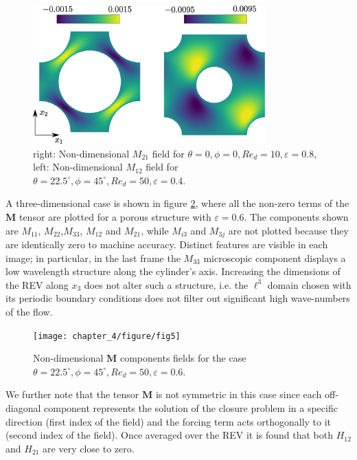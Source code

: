 \begin{figure}[H]
	\centering
	\includegraphics[width=0.8\textwidth]{chapter_4/figure/fig3}
	\caption{right: Non-dimensional $M_{21}$ field for $\theta=0, \phi=0, Re_d=10, \varepsilon=0.8$, left: Non-dimensional $M_{12}$ field for $\theta=22.5^{\circ}, \phi=45^{\circ}, Re_d=50, \varepsilon=0.4$.}
	\label{fig:3ch4}
\end{figure}

A three-dimensional case is shown in  figure \ref{fig:5ch4}, where all the non-zero terms of the $\mathbf{M}$ tensor are plotted for a porous
structure with $\varepsilon=0.6$. The components shown are $M_{11}$, $M_{22}$,$M_{33}$, $M_{12}$ and $M_{21}$, while $M_{i3}$ and $M_{3j}$ are 
not plotted because they are identically zero to machine accuracy. Distinct features are visible in each image; in particular, in the last 
frame the $M_{33}$ microscopic component displays a low wavelength structure along the cylinder's axis. Increasing the dimensions of the REV 
along $x_3$ does not alter such a structure, i.e. the $\ell^3$ domain chosen with its periodic boundary conditions does not filter out 
significant high wave-numbers of the flow. 


\begin{figure}[H]
	\centering
	\texttt{[image: chapter\_4/figure/fig5]}
	\caption{Non-dimensional $\mathbf{M}$ components fields for the case $\theta=22.5^{\circ}, \phi=45^{\circ}, Re_d=50, \varepsilon=0.6$.}
	\label{fig:5ch4}
\end{figure}    

	\newpage 
We further note that the tensor $\mathbf{M}$ is not symmetric in this case since each off-diagonal component 
represents the solution of the closure problem in a specific direction (first index of the field) and the forcing term acts orthogonally to it
(second index of the field).  Once averaged over the REV it is found that both $H_{12}$ and $H_{21}$ are very close to zero.  


